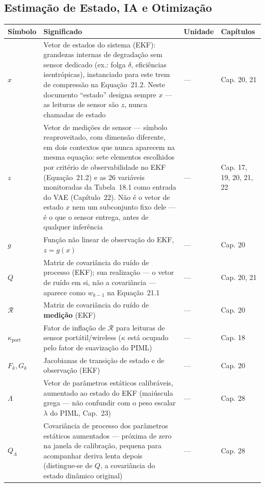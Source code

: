 \documentclass[12pt,a4paper]{article}
\numberwithin{equation}{section}
\numberwithin{table}{section}
\numberwithin{figure}{section}
\begin{document}
{\subsection*{Estimação de Estado, IA e Otimização}
\begin{longtable}{>{\raggedright\arraybackslash}p{2.8cm} >{\raggedright\arraybackslash}p{5.3cm} >{\raggedright\arraybackslash}p{2.1cm} >{\raggedright\arraybackslash}p{4.2cm}}
	\toprule
	\textbf{Símbolo} & \textbf{Significado} & \textbf{Unidade} & \textbf{Capítulos} \\ \midrule
	\endhead
	$x$ & Vetor de estados do sistema (EKF): grandezas internas de degradação sem sensor dedicado (ex.: folga $\delta$, eficiências isentrópicas), instanciado para este trem de compressão na Equação~21.2. Neste documento ``estado'' designa sempre $x$ — as leituras de sensor são $z$, nunca chamadas de estado & --- & Cap. 20, 21 \\
	$z$ & Vetor de medições de sensor — símbolo reaproveitado, com dimensão diferente, em dois contextos que nunca aparecem na mesma equação: sete elementos escolhidos por critério de observabilidade no EKF (Equação~21.2) e as 26 variáveis monitoradas da Tabela~18.1 como entrada do VAE (Capítulo~22). Não é o vetor de estado $x$ nem um subconjunto fixo dele — é o que o sensor entrega, antes de qualquer inferência & --- & Cap. 17, 19, 20, 21, 22 \\
	$g$\dag & Função não linear de observação do EKF, $z=g(x)$ & --- & Cap. 20 \\
	$Q$ & Matriz de covariância do ruído de processo (EKF); sua realização — o vetor de ruído em si, não a covariância — aparece como $w_{k-1}$ na Equação~21.1 & --- & Cap. 20, 21 \\
	$\mathcal{R}$\dag & Matriz de covariância do ruído de \textbf{medição} (EKF) & --- & Cap. 20 \\
	$\kappa_{\text{port}}$\dag & Fator de inflação de $\mathcal{R}$ para leituras de sensor portátil/wireless ($\kappa$ está ocupado pelo fator de suavização do PIML) & --- & Cap. 18 \\
	$F_k, G_k$ & Jacobianas de transição de estado e de observação (EKF) & --- & Cap. 20 \\
	$\Lambda$ & Vetor de parâmetros estáticos calibráveis, aumentado ao estado do EKF (maiúscula grega — não confundir com o peso escalar $\lambda$ do PIML, Cap.~23) & --- & Cap. 28 \\
	$Q_\Lambda$\dag & Covariância de processo dos parâmetros estáticos aumentados — próxima de zero na janela de calibração, pequena para acompanhar deriva lenta depois (distingue-se de $Q$, a covariância do estado dinâmico original) & --- & Cap. 28 \\

\end{longtable}}
\end{document}
